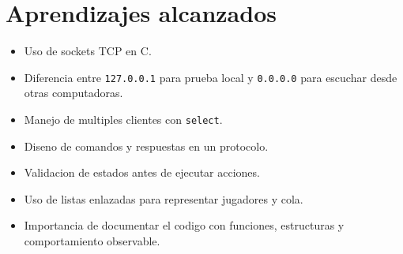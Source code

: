\documentclass[12pt,a4paper]{article}
\begin{document}
\section{Aprendizajes alcanzados}

\begin{itemize}
    \item Uso de sockets TCP en C.
    \item Diferencia entre \texttt{127.0.0.1} para prueba local y
    \texttt{0.0.0.0} para escuchar desde otras computadoras.
    \item Manejo de multiples clientes con \texttt{select}.
    \item Diseno de comandos y respuestas en un protocolo.
    \item Validacion de estados antes de ejecutar acciones.
    \item Uso de listas enlazadas para representar jugadores y cola.
    \item Importancia de documentar el codigo con funciones, estructuras y
    comportamiento observable.
\end{itemize}
\end{document}
